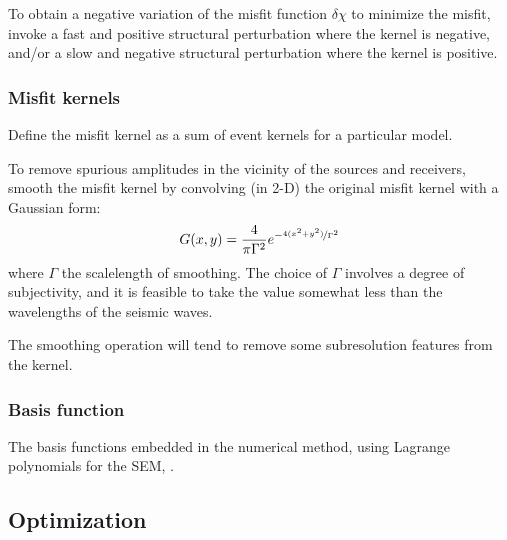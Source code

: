 To obtain a negative variation of the misfit function $\delta\chi$ to minimize the misfit,
invoke a fast and positive structural perturbation where the kernel is negative,
and/or a slow and negative structural perturbation where the kernel is positive.

\subsubsection{Misfit kernels}
Define the misfit kernel as a sum of event kernels for a particular model.

To remove spurious amplitudes in the vicinity of the sources and receivers,
smooth the misfit kernel by convolving (in 2-D) the original misfit kernel with a Gaussian form:
\[ G(x,y)=\frac{4}{\pi\Gamma^2}e^{-\nicefrac{4(x^2+y^2)}{\Gamma^2}} \]
where $\Gamma$ the scalelength of smoothing.
The choice of $\Gamma$ involves a degree of subjectivity,
and it is feasible to take the value somewhat less than the wavelengths of the seismic waves.

The smoothing operation will tend to remove some subresolution features from the kernel.

\subsubsection{Basis function}
The basis functions embedded in the numerical method, using Lagrange polynomials for the SEM,
.

\subsection{Optimization}
